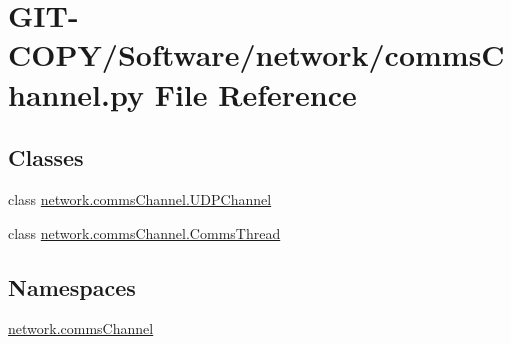 \hypertarget{GIT-COPY_2Software_2network_2commsChannel_8py}{}\section{G\+I\+T-\/\+C\+O\+P\+Y/\+Software/network/comms\+Channel.py File Reference}
\label{GIT-COPY_2Software_2network_2commsChannel_8py}
\subsection*{Classes}
\begin{DoxyCompactItemize}
\item 
class \hyperlink{classnetwork_1_1commsChannel_1_1UDPChannel}{network.\+comms\+Channel.\+U\+D\+P\+Channel}
\item 
class \hyperlink{classnetwork_1_1commsChannel_1_1CommsThread}{network.\+comms\+Channel.\+Comms\+Thread}
\end{DoxyCompactItemize}
\subsection*{Namespaces}
\begin{DoxyCompactItemize}
\item 
 \hyperlink{namespacenetwork_1_1commsChannel}{network.\+comms\+Channel}
\end{DoxyCompactItemize}
